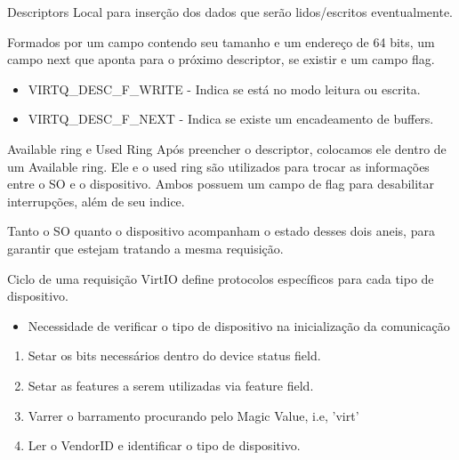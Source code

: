 \documentclass[brazil,nolapesd,aspectratio=169,noartschool]{lapesd-slides}
\begin{document}
\begin{frame}{Descriptors}
	Local para inserção dos dados que serão lidos/escritos eventualmente.

	\vspace{1em}

	Formados por um campo contendo seu tamanho e um endereço de 64 bits, um campo next que aponta
	para o próximo descriptor, se existir e um campo flag.

	\vspace{1em}

	\begin{itemize}
		\item VIRTQ{\_}DESC{\_}F{\_}WRITE - Indica se está no modo leitura ou escrita.
		\item VIRTQ{\_}DESC{\_}F{\_}NEXT - Indica se existe um encadeamento de buffers.
	\end{itemize}
\end{frame}

\begin{frame}{Available ring e Used Ring}
	Após preencher o descriptor, colocamos ele dentro de um Available ring. Ele e o used ring são
	utilizados para trocar as informações entre o SO e o dispositivo. Ambos possuem um campo de
	flag para desabilitar interrupções, além de seu indice.

	\vspace{1em}

	Tanto o SO quanto o dispositivo acompanham o estado desses dois aneis, para garantir que estejam
	tratando a mesma requisição.
\end{frame}

\begin{frame}{Ciclo de uma requisição}
	VirtIO define protocolos específicos para cada tipo de dispositivo.
	\begin{itemize}
		\item Necessidade de verificar o tipo de dispositivo na inicialização da comunicação
	\end{itemize}

	\vspace{1em}

	\begin{enumerate}
		\item Setar os bits necessários dentro do device status field.
		\item Setar as features a serem utilizadas via feature field.
		\item Varrer o barramento procurando pelo Magic Value, i.e, 'virt'
		\item Ler o VendorID e identificar o tipo de dispositivo.
	\end{enumerate}
\end{frame}
\end{document}
